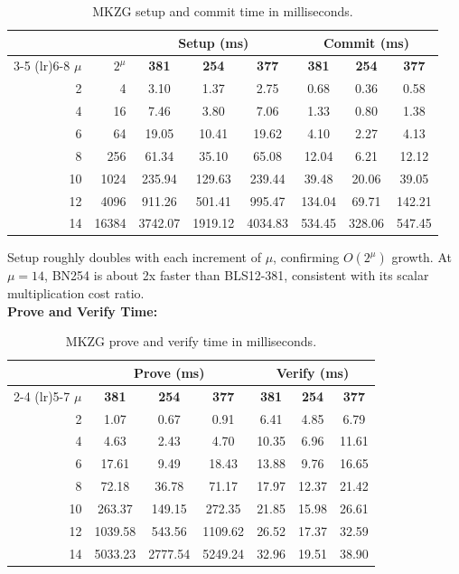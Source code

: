 \begin{table}[H]
\centering
\caption{MKZG setup and commit time in milliseconds.}
\label{tab:mkzg-setup-commit}
\begin{tabular}{rrcccccc}
\toprule
& & \multicolumn{3}{c}{\textbf{Setup (ms)}} & \multicolumn{3}{c}{\textbf{Commit (ms)}} \\
\cmidrule(lr){3-5} \cmidrule(lr){6-8}
$\mu$ & $2^\mu$ & \textbf{381} & \textbf{254} & \textbf{377}
               & \textbf{381} & \textbf{254} & \textbf{377} \\
\midrule
2  & 4     & 3.10    & 1.37    & 2.75    & 0.68   & 0.36   & 0.58   \\
4  & 16    & 7.46    & 3.80    & 7.06    & 1.33   & 0.80   & 1.38   \\
6  & 64    & 19.05   & 10.41   & 19.62   & 4.10   & 2.27   & 4.13   \\
8  & 256   & 61.34   & 35.10   & 65.08   & 12.04  & 6.21   & 12.12  \\
10 & 1024  & 235.94  & 129.63  & 239.44  & 39.48  & 20.06  & 39.05  \\
12 & 4096  & 911.26  & 501.41  & 995.47  & 134.04 & 69.71  & 142.21 \\
14 & 16384 & 3742.07 & 1919.12 & 4034.83 & 534.45 & 328.06 & 547.45 \\
\bottomrule
\end{tabular}
\end{table}

Setup roughly doubles with each increment of $\mu$, confirming
$O(2^\mu)$ growth. At $\mu = 14$, BN254 is about 2x faster than
BLS12-381, consistent with its scalar multiplication cost ratio.
\\
\textbf{Prove and Verify Time:}

\begin{table}[H]
\centering
\caption{MKZG prove and verify time in milliseconds.}
\label{tab:mkzg-prove-verify}
\begin{tabular}{rcccccc}
\toprule
& \multicolumn{3}{c}{\textbf{Prove (ms)}} & \multicolumn{3}{c}{\textbf{Verify (ms)}} \\
\cmidrule(lr){2-4} \cmidrule(lr){5-7}
$\mu$ & \textbf{381} & \textbf{254} & \textbf{377}
      & \textbf{381} & \textbf{254} & \textbf{377} \\
\midrule
2  & 1.07    & 0.67    & 0.91    & 6.41  & 4.85  & 6.79  \\
4  & 4.63    & 2.43    & 4.70    & 10.35 & 6.96  & 11.61 \\
6  & 17.61   & 9.49    & 18.43   & 13.88 & 9.76  & 16.65 \\
8  & 72.18   & 36.78   & 71.17   & 17.97 & 12.37 & 21.42 \\
10 & 263.37  & 149.15  & 272.35  & 21.85 & 15.98 & 26.61 \\
12 & 1039.58 & 543.56  & 1109.62 & 26.52 & 17.37 & 32.59 \\
14 & 5033.23 & 2777.54 & 5249.24 & 32.96 & 19.51 & 38.90 \\
\bottomrule
\end{tabular}
\end{table}

